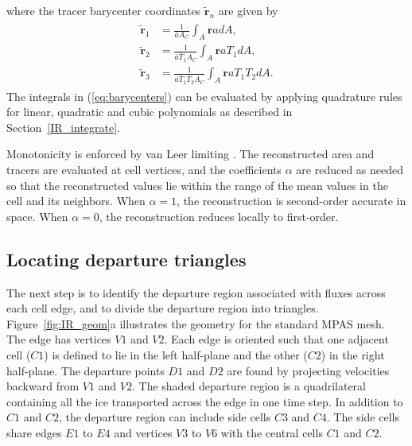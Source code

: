 where the tracer barycenter coordinates $\mathbf{\tilde{r}}_n$ are given by
\begin{align}
\begin{split}
\label{eq:barycenters}
   {{{\mathbf{\tilde{r}}}}_{1}} & = \frac{1}{\bar{a}{{A}_{C}}}\int_{A}{\mathbf{r}adA,}  \\
   {{{\mathbf{\tilde{r}}}}_{2}} & = \frac{1}{\bar{a}{{{\bar{T}}}_{1}}{{A}_{C}}}\int_{A}{\mathbf{r}a{{T}_{1}}dA,}  \\
   {{{\mathbf{\tilde{r}}}}_{3}} & = \frac{1}{\bar{a}{{{\bar{T}}}_{1}}{{{\bar{T}}}_{2}}{{A}_{C}}}\int_{A}{\mathbf{r}a{{T}_{1}}{{T}_{2}}dA.}
\end{split}
\end{align}
The integrals in (\ref{eq:barycenters}) can be evaluated by applying quadrature rules for linear, quadratic and cubic polynomials as described in Section~\ref{IR_integrate}.

Monotonicity is enforced by van Leer limiting \citep{vanLeer79}. The reconstructed area and tracers are evaluated at cell vertices, and the coefficients $\alpha$  are reduced as needed so that the reconstructed values lie within the range of the mean values in the cell and its neighbors. When $\alpha = 1$, the reconstruction is second-order accurate in space. When $\alpha = 0$, the reconstruction reduces locally to first-order.

\subsection{Locating departure triangles}
\label{IR_triangles}

The next step is to identify the departure region associated with fluxes across each cell edge, and to divide the departure region into triangles. Figure~\ref{fig:IR_geom}a illustrates the geometry for the standard MPAS mesh. The edge has vertices $V1$ and $V2$. Each edge is oriented such that one adjacent cell ($C1$) is defined to lie in the left half-plane and the other ($C2$) in the right half-plane. The departure points $D1$ and $D2$ are found by projecting velocities backward from $V1$ and $V2$. The shaded departure region is a quadrilateral containing all the ice transported across the edge in one time step. In addition to $C1$ and $C2$, the departure region can include side cells $C3$ and $C4$. The side cells share edges $E1$ to $E4$ and vertices $V3$ to $V6$ with the central cells $C1$ and $C2$.

